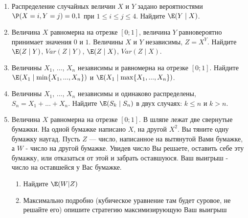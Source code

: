 \documentclass[pdftex,12pt,a4paper]{article}
\begin{document}
\begin{enumerate}
\item Распределение случайных величин $X$ и $Y$ задано вероятностями $\P(X=i,Y=j)=0{,}1$ при $1\leq i \leq j \leq 4$. Найдите $\E(Y\mid X)$. 
\item Величина $X$ равномерна на отрезке $[0;1]$, величина $Y$ равновероятно принимает значения $0$ и $1$. Величины $X$ и $Y$ независимы, $Z=X^Y$. Найдите $\E(Z\mid Y)$, $Var(Z\mid Y)$, $\E(Z\mid X)$, $Var(Z\mid X)$.
\item Величины $X_1$, ..., $X_n$ независимы и равномерна на отрезке $[0;1]$. Найдите $\E(X_1\mid \min\{X_1,...,X_n\})$ и $\E(X_1\mid \max\{X_1,...,X_n\})$.
\item Величины $X_1$, ..., $X_n$ независимы и одинаково распределены, $S_n=X_1+...+X_n$. Найдите $\E(S_k \mid S_n )$ в двух случаях: $k\leq n$ и $k>n$.
\item Величина $X$ равномерна на отрезке $[0;1]$. В шляпе лежат две свернутые бумажки. На одной бумажке написано $X$, на другой $X^{2}$. Вы тяните одну бумажку наугад. Пусть $Z$ --- число, написанное на вытянутой Вами бумажке, а $W$ - число на другой бумажке. Увидев число Вы решаете, оставить себе эту бумажку, или отказаться от этой и забрать оставшуюся. Ваш выигрыш - число на оставшейся у Вас бумажке. 
\begin{enumerate}
\item Найдите $\E(W|Z)$ 
\item Максимально подробно (кубическое уравнение там будет суровое, не решайте его) опишите стратегию максимизирующую Ваш выигрыш 
\end{enumerate}

\end{enumerate}






\printindex %
\end{document}
